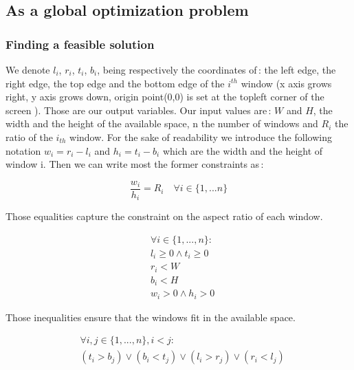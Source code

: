 \documentclass{acmtog}
\begin{document}
\subsection{As a global optimization problem}

\subsubsection{Finding a feasible solution}

We denote $l_i$, $r_i$, $t_i$, $b_i$, being respectively the coordinates of\,: the left edge, the right edge, the top edge and the bottom edge of the $i^{th}$ window (x axis grows right, y axis grows down, origin point(0,0) is set at the topleft corner of the screen ). Those are our output variables. Our input values are\,:  $W$ and $H$, the width and the height of the available space, n the number of windows and $R_i$ the ratio of the $i_{th}$ window. For the sake of readability we introduce the following notation $w_i = r_i - l_i$  and  $h_i = t_i - b_i$ which are the width and the height of window i. Then we can write most the former constraints as\,:

\begin{equation}
\dfrac{w_i}{h_i} = R_i \quad \forall  i \in  \{1, ... n\}
\label{eq:aspect}
\end{equation}

Those equalities capture the constraint on the aspect ratio of each window.

\begin{equation}
\begin{split}
&\forall  i \in  \{1, ... ,n\}  :\\
&l_i \geq 0 \wedge t_i \geq 0 \\
&r_i < W \\
&b_i  < H  \\
&w_i > 0\wedge h_i > 0
\end{split}
\label{eq:fit}
\end{equation}

Those inequalities ensure that the windows fit in the available space.

\begin{equation}
\begin{split}
&\forall i, j \in \{1,..., n\}, i < j : \\
&(t_i > b_j) \lor (b_i < t_j) \lor (l_i > r_j) \lor (r_i < l_j)
\end{split}
\label{eq:logical}
\end{equation}
\end{document}
